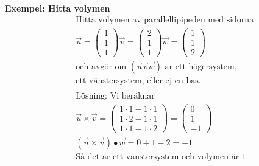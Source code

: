 \begin{multicols}{2}
\textbf{Exempel: Hitta volymen}
\begin{align*} 
  &\quad  \text{Hitta volymen av parallellipipeden med sidorna } \\
  &\quad
  \vec{u} = \begin{pmatrix} 1 \\ 1 \\ 1 \end{pmatrix}
  \vec{v} = \begin{pmatrix} 2 \\ 1 \\ 1 \end{pmatrix}
  \vec{w} = \begin{pmatrix} 1 \\ 1 \\ 2 \end{pmatrix} \\
  &\quad  \text{och avgör om $(\vec{u} \vec{v} \vec{w})$ är ett högersystem,} \\
  &\quad  \text{ett vänstersystem, eller ej en bas.} \\
  &\quad  \\
  &\quad  \text{Lösning: Vi beräknar} \\
  &\quad  \vec{u}\times\vec{v} =
  \begin{pmatrix} 1\cdot{1}-1\cdot{1} \\ 1\cdot{2}-1\cdot{1} \\ 1\cdot{1}-1\cdot{2} \end{pmatrix}
  = \begin{pmatrix} 0 \\ 1 \\ -1 \end{pmatrix} \\
  &\quad  (\vec{u}\times\vec{v})\bullet\vec{w} = 0+1-2=-1 \\
  &\quad  \text{Så det är ett vänstersystem och volymen är 1} \\
\end{align*}



\end{multicols}
